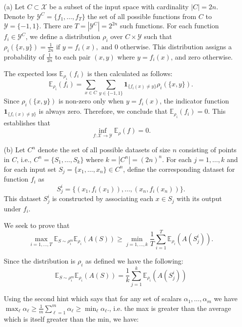 \documentclass{article}
\begin{document}
\begin{itemize}
    \item[(a)] Let \( C \subset \mathcal{X} \) be a subset of the input space with cardinality \( |C| = 2n \). Denote by \( \mathcal{Y}^C = \{f_1, \dots, f_T\} \) the set of all possible functions from \( C \) to \( \mathcal{Y} = \{-1, 1\} \). There are \( T = |\mathcal{Y}^C| = 2^{2n} \) such functions. For each function \( f_i \in \mathcal{Y}^C \), we define a distribution \( \rho_i \) over \( C \times \mathcal{Y} \) such that
    \( \rho_i(\{x, y\}) = \frac{1}{2n} \text{ if } y = f_i(x), \text{ and } 0 \text{ otherwise} \).
    This distribution assigns a probability of \( \frac{1}{2n} \) to each pair \( (x, y) \) where \( y = f_i(x) \), and zero otherwise.
    
    The expected loss \( \mathbb{E}_{\rho_i}(f_i) \) is then calculated as follows:
    \[
    \mathbb{E}_{\rho_i}(f_i) = \sum_{x \in C} \sum_{y \in \{-1, 1\}} \mathbf{1}_{\{f_i(x) \neq y\}} \rho_i(\{x, y\}).
    \]
    Since \( \rho_i(\{x, y\}) \) is non-zero only when \( y = f_i(x) \), the indicator function \( \mathbf{1}_{\{f_i(x) \neq y\}} \) is always zero. Therefore, we conclude that \( \mathbb{E}_{\rho_i}(f_i) = 0 \). This establishes that
    \[
    \inf_{f: \mathcal{X} \rightarrow \mathcal{Y}} \mathbb{E}_\rho(f) = 0.
    \]
    
    \item[(b)] Let \( C^n \) denote the set of all possible datasets of size \( n \) consisting of points in \( C \), i.e., \( C^n = \{S_1, \dots, S_k\} \) where \( k = |C^n| = (2n)^n \). For each \( j = 1, \dots, k \) and for each input set \( S_j = \{x_1, \dots, x_n\} \in C^n \), define the corresponding dataset for function \( f_i \) as
    \[
    S_j^i = \{(x_1, f_i(x_1)), \dots, (x_n, f_i(x_n))\}.
    \]
    This dataset \( S_j^i \) is constructed by associating each \( x \in S_j \) with its output under \( f_i \).
    
    We seek to prove that
    \[
    \max_{i=1, \dots, T} \mathbb{E}_{S \sim \rho_i^m} \mathbb{E}_{\rho_i}(A(S)) \ge \min_{j=1, \dots, k} \frac{1}{T} \sum_{i=1}^T \mathbb{E}_{\rho_i}(A(S_j^i)).
    \]
    
    Since the distribution is \(\rho_i\) as defined we have the following:
    \[
    \mathbb{E}_{S \sim \rho_i^m} \mathbb{E}_{\rho_i}(A(S)) = \frac{1}{k}\sum_{j=1}^k\mathbb{E}_{\rho_i}(A(S_j^i))
    \]

    Using the second hint which says that for any set of scalars $\alpha_1, \ldots, \alpha_m$ we have \(\max_{\ell} \alpha_\ell \geq \frac{1}{m} \sum_{\ell=1}^m \alpha_\ell \geq \min_{\ell} \alpha_\ell.
    \), i.e. the max is greater than the average which is itself greater than the min, we have:


\end{itemize}
\end{document}
